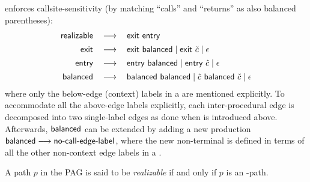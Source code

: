 



\manuLC enforces callsite-sensitivity (by matching ``calls'' and   ``returns'' as also balanced
parentheses):
\begin{equation}
\label{eqn:callsiteLC}
    \begin{tabular}{rcl}
$\realizable$ & $\longrightarrow$ & $\gramexit ~ \gramentry$ \\[1ex]
$\gramexit$ & $\longrightarrow$ & $\gramexit ~ \balanced \mid \gramexit \ \check{c} \mid \epsilon$ \\[1ex] 
$\gramentry$ & $\longrightarrow$ & $\gramentry ~ \balanced \mid \gramentry \ \hat{c} \mid \epsilon$ \\[1ex]
$\balanced$ & $\longrightarrow$ & $\balanced ~ \balanced \mid \hat{c} ~ \balanced ~ \check{c} \mid \epsilon $
    \end{tabular}
\end{equation}
where only the below-edge  (context) labels in a  \pag are mentioned explicitly.
To accommodate all the above-edge labels explicitly, 
each inter-procedural \assign edge
is decomposed into 
two single-label edges
as done when \manuLF is introduced above.
Afterwards, 
$\textsf{balanced}$ can be extended by adding a new production 
$\textsf{balanced} \longrightarrow \textsf{no-call-edge-label}$, where the new non-terminal
  is defined in terms of all the other 
non-context edge
labels 
 in a  \pag \cite{sridharan2007refinement}.

A path $p$ in the PAG is said to be \emph{realizable} 
if and only if $p$ is an \manuLC-path.

